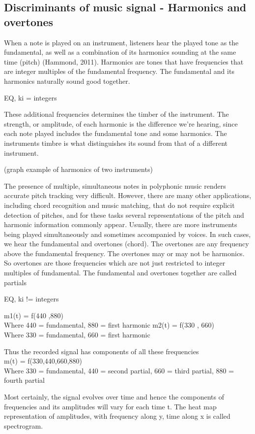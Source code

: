 \subsection{ Discriminants of music signal - Harmonics and overtones }
When a note is played on an instrument, listeners hear the played tone as the fundamental, as well as a combination of its harmonics sounding at the same time (pitch) (Hammond, 2011). 
Harmonics are tones that have frequencies that are integer multiples of the fundamental frequency. The fundamental and its harmonics naturally sound good together.

EQ, ki = integers 

These additional frequencies determines the timber of the instrument. The strength, or amplitude, of each harmonic is the difference we’re hearing, since each note played includes the fundamental tone and some harmonics. The instruments timbre is what distinguishes its sound from that of a different instrument. 

(graph example of harmonics of two instruments)

The presence of multiple, simultaneous notes in polyphonic music renders accurate pitch tracking very difficult. However, there are many other applications, including chord recognition and music matching, that do not require explicit detection of pitches, and for these tasks several representations of the pitch and harmonic information commonly appear. Usually, there are more instruments being played simultaneously and sometimes accompanied by voices. In such cases, we hear the fundamental and overtones (chord). The overtones are any frequency above the fundamental frequency.  The overtones may or may not be harmonics. So overtones are those frequencies which are not just restricted to integer multiples of fundamental. The fundamental and overtones together are called partials

EQ, ki != integers

m1(t) = f(440 ,880) \\
   Where 440 = fundamental, 880 = first harmonic
m2(t) = f(330 , 660)\\
   Where 330 = fundamental, 660 = first harmonic
   
Thus the recorded signal has components of all these frequencies\\
  m(t) = f(330,440,660,880)\\
  Where 330 = fundamental, 440 = second partial, 660 = third partial, 880 = fourth partial
  
Most certainly, the signal evolves over time and hence the components of frequencies and its amplitudes will vary for each time t. The heat map representation of amplitudes, with frequency along y, time along   x is called spectrogram. 

